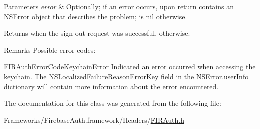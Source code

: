 \begin{DoxyParams}{Parameters}
{\em error} & Optionally; if an error occurs, upon return contains an N\+S\+Error object that describes the problem; is nil otherwise. \\
\hline
\end{DoxyParams}
\begin{DoxyReturn}{Returns}
when the sign out request was successful.  otherwise. 
\end{DoxyReturn}
\begin{DoxyRemark}{Remarks}
Possible error codes\+:
\begin{DoxyItemize}
\item {\ttfamily F\+I\+R\+Auth\+Error\+Code\+Keychain\+Error} Indicated an error occurred when accessing the keychain. The {\ttfamily N\+S\+Localized\+Failure\+Reason\+Error\+Key} field in the {\ttfamily N\+S\+Error.\+user\+Info} dictionary will contain more information about the error encountered. 
\end{DoxyItemize}
\end{DoxyRemark}


The documentation for this class was generated from the following file\+:\begin{DoxyCompactItemize}
\item 
Frameworks/\+Firebase\+Auth.\+framework/\+Headers/\hyperlink{_f_i_r_auth_8h}{F\+I\+R\+Auth.\+h}\end{DoxyCompactItemize}
